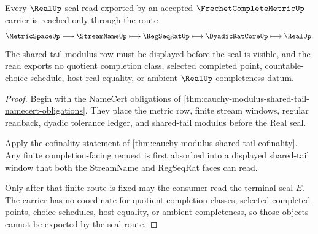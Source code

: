 \begin{theorem}
\label{thm:cauchy-modulus-shared-tail-real-seal-route}
Every $\RealUp$ seal read exported by an accepted $\FrechetCompleteMetricUp$ carrier is reached only through the route
$$
\MetricSpaceUp \longmapsto \StreamNameUp \longmapsto \RegSeqRatUp \longmapsto \DyadicRatCoreUp \longmapsto \RealUp .
$$
The shared-tail modulus row must be displayed before the seal is visible, and the read exports no quotient completion class, selected completed point, countable-choice schedule, host real equality, or ambient $\RealUp$ completeness datum.
\end{theorem}
\begin{proof}
Begin with the NameCert obligations of \autoref{thm:cauchy-modulus-shared-tail-namecert-obligations}. They place the metric row, finite stream windows, regular readback, dyadic tolerance ledger, and shared-tail modulus before the Real seal.

Apply the cofinality statement of \autoref{thm:cauchy-modulus-shared-tail-cofinality}. Any finite completion-facing request is first absorbed into a displayed shared-tail window that both the StreamName and RegSeqRat faces can read.

Only after that finite route is fixed may the consumer read the terminal seal $E$. The carrier has no coordinate for quotient completion classes, selected completed points, choice schedules, host equality, or ambient completeness, so those objects cannot be exported by the seal route.
\end{proof}




